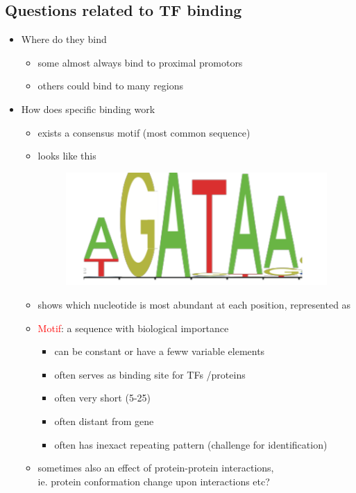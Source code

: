 \documentclass[font=12pt]{article}
\begin{document}
\subsection{Questions related to TF binding}
\begin{itemize}
	\item Where do they bind
	\begin{itemize}
		\item some almost always bind to proximal promotors
		\item others could bind to many regions
	\end{itemize}
	\item How does specific binding work
	\begin{itemize}
		\item exists a consensus motif (most common sequence)
		\item looks like this 
		\begin{figure}[h!]
			\centering
			\includegraphics[scale=0.2]{concensusmotif}
			\label{fig:concensusmotif}
		\end{figure}
		\item shows which nucleotide is most abundant at each position, represented as 
		\item \textcolor{red}{Motif}: a  sequence with biological importance
			\begin{itemize}
				\item can be constant or have a feww variable elements
				\item often serves as binding site for TFs /proteins
				\item often very short (5-25)
				\item often distant from gene
				\item  often has inexact repeating pattern (challenge for identification)
			\end{itemize}
		\item sometimes also an effect of protein-protein interactions,\\
			ie. protein conformation change upon interactions etc?

\end{itemize}
\end{itemize}
\end{document}
